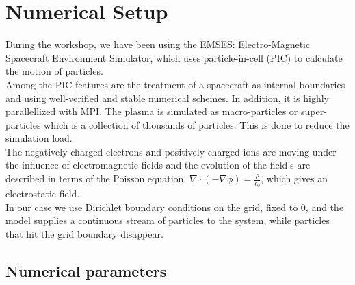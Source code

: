 \documentclass[aip, 
rsi, 
amsmath,
amssymb,
longbibliography,
reprint]{revtex4-1}
\begin{document}
\section{\label{sec:numsetup} Numerical Setup}

During the workshop, we have been using the EMSES: Electro-Magnetic Spacecraft Environment Simulator, which uses particle-in-cell (PIC) to calculate the motion of particles.\\

Among the PIC features are the treatment of a spacecraft as internal boundaries and using well-verified and stable numerical schemes. In addition, it is highly parallellized with MPI. The plasma is simulated as macro-particles or super-particles\cite{numsetup} which is a collection of thousands of particles. This is done to reduce the simulation load.\\

The negatively charged electrons and positively charged ions are moving under the influence of electromagnetic fields and the evolution of the field’s are described in terms of the Poisson equation, $\nabla\cdot(-\nabla \phi)=\frac{\rho}{\epsilon_0}$, which gives an electrostatic field\cite{numsetup2}.\\

In our case we use Dirichlet boundary conditions on the grid, fixed to 0, and the model supplies a continuous stream of particles to the system, while particles that hit the grid boundary disappear.

\subsection{Numerical parameters}
\end{document}
